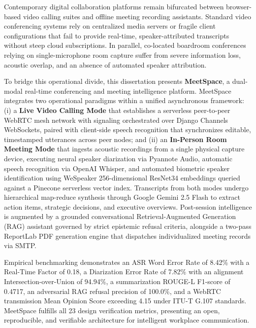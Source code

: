 \documentclass[12pt,oneside,letterpaper]{report}
\numberwithin{equation}{chapter} %
\begin{document}
\begin{doublespacing}
Contemporary digital collaboration platforms remain bifurcated between browser-based video calling suites and offline meeting recording assistants. Standard video conferencing systems rely on centralized media servers or fragile client configurations that fail to provide real-time, speaker-attributed transcripts without steep cloud subscriptions. In parallel, co-located boardroom conferences relying on single-microphone room capture suffer from severe information loss, acoustic overlap, and an absence of automated speaker attribution. 

To bridge this operational divide, this dissertation presents \textbf{MeetSpace}, a dual-modal real-time conferencing and meeting intelligence platform. MeetSpace integrates two operational paradigms within a unified asynchronous framework: (i) a \textbf{Live Video Calling Mode} that establishes a serverless peer-to-peer WebRTC mesh network with signaling orchestrated over Django Channels WebSockets, paired with client-side speech recognition that synchronizes editable, timestamped utterances across peer nodes; and (ii) an \textbf{In-Person Room Meeting Mode} that ingests acoustic recordings from a single physical capture device, executing neural speaker diarization via Pyannote Audio, automatic speech recognition via OpenAI Whisper, and automated biometric speaker identification using WeSpeaker 256-dimensional ResNet34 embeddings queried against a Pinecone serverless vector index. Transcripts from both modes undergo hierarchical map-reduce synthesis through Google Gemini 2.5 Flash to extract action items, strategic decisions, and executive overviews. Post-session intelligence is augmented by a grounded conversational Retrieval-Augmented Generation (RAG) assistant governed by strict epistemic refusal criteria, alongside a two-pass ReportLab PDF generation engine that dispatches individualized meeting records via SMTP. 

Empirical benchmarking demonstrates an ASR Word Error Rate of 8.42\% with a Real-Time Factor of 0.18, a Diarization Error Rate of 7.82\% with an alignment Intersection-over-Union of 94.94\%, a summarization ROUGE-L F1-score of 0.4717, an adversarial RAG refusal precision of 100.0\%, and a WebRTC transmission Mean Opinion Score exceeding 4.15 under ITU-T G.107 standards. MeetSpace fulfills all 23 design verification metrics, presenting an open, reproducible, and verifiable architecture for intelligent workplace communication.
\end{doublespacing}
\end{document}
